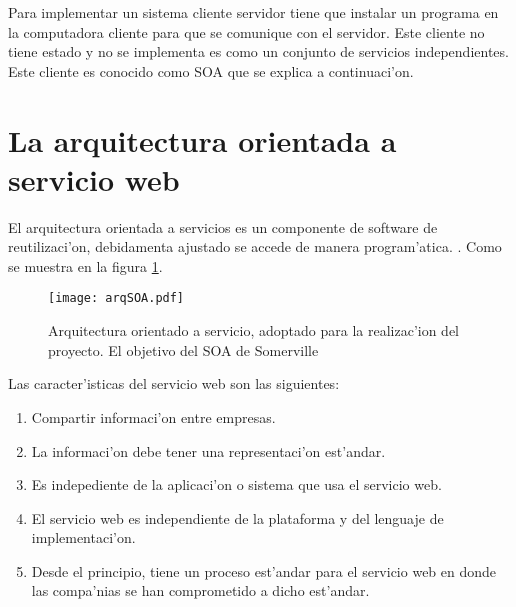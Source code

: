 Para implementar un sistema cliente servidor tiene que instalar un programa en la computadora cliente para que se comunique con el servidor. Este cliente no tiene estado y no se implementa es como un conjunto de servicios independientes. Este cliente es conocido como SOA que se explica a continuaci'on.

\section{La arquitectura orientada a servicio web}
El arquitectura orientada a servicios es un componente de software de reutilizaci'on, debidamenta ajustado se accede de manera program'atica. \cite{Somerville2011}. Como se muestra en la figura \ref{fig:ArquitecturaSOA}.

\begin{figure}[H]
\centering
\texttt{[image: arqSOA.pdf]}
\captionsetup{justification=centering, margin=2cm}
\caption{Arquitectura orientado a servicio, adoptado para la realizac'ion del proyecto. El objetivo del SOA de Somerville \cite{Somerville2011}}
\label{fig:ArquitecturaSOA}
\end{figure}

Las caracter'isticas del servicio web son las siguientes:
\begin{enumerate}
\item Compartir informaci'on entre empresas.
\item La informaci'on debe tener una representaci'on est'andar.
\item Es indepediente de la aplicaci'on o sistema que usa el servicio web.
\item El servicio web es independiente de la plataforma y del lenguaje de implementaci'on.
\item Desde el principio, tiene un proceso est'andar para el servicio web en donde las compa'nias se han comprometido a dicho est'andar. 
\end{enumerate}



